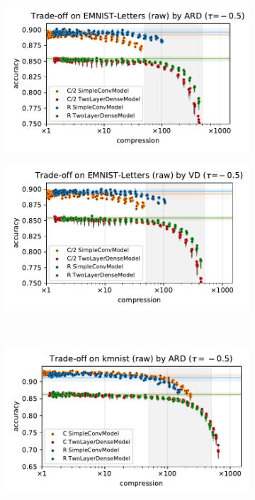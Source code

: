 \documentclass[a4paper,10pt,onecolumn]{article}
\begin{document}
\begin{figure}[b]
\begin{subfigure}[b]{0.5\columnwidth}
    \centering
    \includegraphics[width=\columnwidth]{figure__mnist-like__trade-off/appendix__cmp__ARD__emnist_letters__raw__-0.5.pdf}
  \end{subfigure}%
  \begin{subfigure}[b]{0.5\columnwidth}
    \centering
    \includegraphics[width=\columnwidth]{figure__mnist-like__trade-off/appendix__cmp__VD__emnist_letters__raw__-0.5.pdf}
  \end{subfigure} \\ %
  \begin{subfigure}[b]{0.5\columnwidth}
    \centering
    \includegraphics[width=\columnwidth]{figure__mnist-like__trade-off/appendix__ARD__kmnist__raw__-0.5.pdf}

\end{subfigure}
\end{figure}
\end{document}
